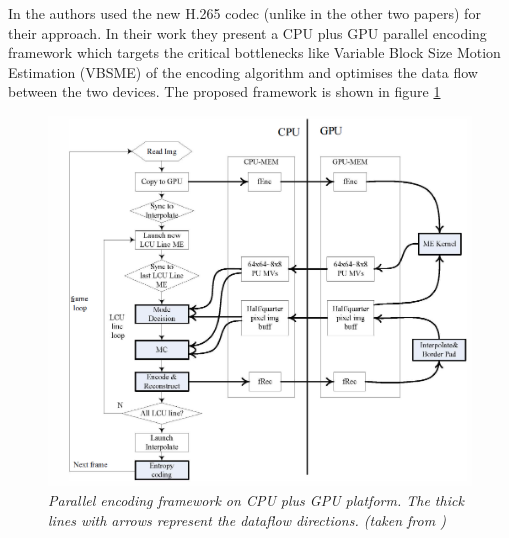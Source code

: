In \cite{Paper3} the authors used the new H.265 codec (unlike in the other two papers) for their approach. In their work they present a CPU plus GPU parallel encoding framework which targets the critical bottlenecks like Variable Block Size Motion Estimation (VBSME) of the encoding algorithm and optimises the data flow between the two devices. The proposed framework is shown in figure \ref{hevc_framework}

\begin{figure}[ht]
\centerline{\includegraphics[scale=0.5]{pics/hevc_framework}} %
\caption{\label{hevc_framework}{\it Parallel encoding framework on CPU plus GPU platform.
The thick lines with arrows represent the dataflow directions. (taken from \cite{Paper3})}}
\end{figure}

